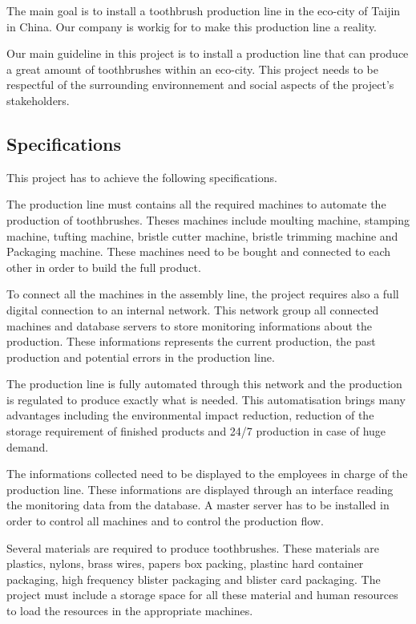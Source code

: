 The main goal is to install a toothbrush production line in the eco-city of Taijin in China.
Our company is workig for \moldco to make this production line a reality.

Our main guideline in this project is to install a production line that can produce a great amount of toothbrushes within an eco-city.
This project needs to be respectful of the surrounding environnement and social aspects of the project's stakeholders.

\subsection{Specifications}

This project has to achieve the following specifications.

The production line must contains all the required machines to automate the production of toothbrushes.
Theses machines include moulting machine, stamping machine, tufting machine, bristle cutter machine, bristle trimming machine and Packaging machine.
These machines need to be bought and connected to each other in order to build the full product.

To connect all the machines in the assembly line, the project requires also a full digital connection to an internal network.
This network group all connected machines and database servers to store monitoring informations about the production.
These informations represents the current production, the past production and potential errors in the production line.

The production line is fully automated through this network and the production is regulated to produce exactly what is needed.
This automatisation brings many advantages including the environmental impact reduction, reduction of the storage requirement of finished products and 24/7 production in case of huge demand.

The informations collected need to be displayed to the employees in charge of the production line.
These informations are displayed through an interface reading the monitoring data from the database.
A master server has to be installed in order to control all machines and to control the production flow.

Several materials are required to produce toothbrushes.
These materials are plastics, nylons, brass wires, papers box packing, plastinc hard container packaging, high frequency blister packaging and blister card packaging.
The project must include a storage space for all these material and human resources to load the resources in the appropriate machines.

